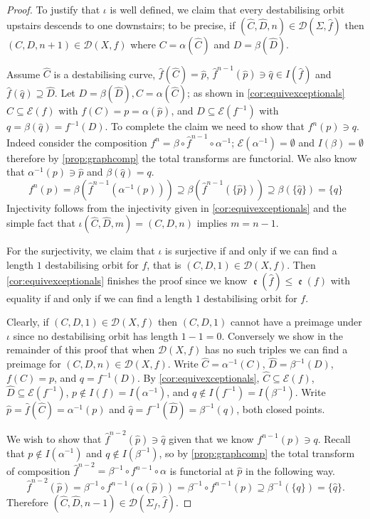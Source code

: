 \documentclass[11pt, final]{amsart}
\newcommand{\E}{\mathcal{E}}
\newcommand{\nin}{\notin}
\newcommand{\emp}{\emptyset}
\newcommand{\sgraph}{\Sigma}
\newcommand{\nice}{untangled}
\DeclareMathOperator{\comp}{\mathfrak e}
\begin{document}
\begin{proof}
To justify that $\iota$ is well defined, we claim that every destabilising orbit upstairs descends to one downstairs; to be precise, if $(\hat C, \hat D, n) \in \mathcal D(\sgraph, \hat f)$ then $(C, D, n+1) \in \mathcal D(X, f)$ where $C = \alpha(\hat C)$ and $D = \beta(\hat D)$.

Assume $\hat C$ is a destabilising curve, $\hat f(\hat C) = \hat p$, %
  $\hat f^{n-1}(\hat p) \ni \hat q \in I(\hat f)$ and $\hat f(\hat q) \supseteq \hat D$. Let $D = \beta(\hat D), C = \alpha(\hat C)$; as shown in \autoref{cor:equivexceptionals} $C \subseteq \E(f)$ with $f(C) = p = \alpha(\hat p)$, and $D \subseteq \E(f^{-1})$ with $q = \beta(\hat q) = f^{-1}(D)$. To complete the claim we need to show that $f^n(p) \ni q$.
 Indeed consider the composition $f^n = \beta \circ \hat f^{n-1} \circ \alpha^{-1}$; $\E(\alpha^{-1}) = \emp$ and $I(\beta) = \emp$ therefore by \autoref{prop:graphcomp} the total transforms are functorial. We also know that $\alpha^{-1}(p) \ni \hat p$ and $\beta(\hat q) = q$.
 \[f^n(p) = \beta ( \hat f^{n-1} ( \alpha^{-1}(p))) \supseteq \beta ( \hat f^{n-1} (\{\hat p\})) \supseteq \beta(\{\hat q\}) = \{q\}\]
 Injectivity follows from the injectivity given in \autoref{cor:equivexceptionals} and the simple fact that $\iota(\hat C, \hat D, m) = (C, D, n)$ implies $m=n - 1$.
 
For the surjectivity, we claim that $\iota$ is surjective if and only if we can find a length $1$ destabilising orbit for $f$, that is $(C, D, 1) \in \mathcal D(X, f)$. Then \autoref{cor:equivexceptionals} finishes the proof since we know $\comp(\hat f) \le \comp(f)$ with equality if and only if we can find a length $1$ destabilising orbit for $f$.

Clearly, if $(C, D, 1) \in \mathcal D(X, f)$ then $(C, D, 1)$ cannot have a preimage under $\iota$ since no destabilising orbit has length $1-1=0$. Conversely we show in the remainder of this proof that when $\mathcal D(X, f)$ has no such triples we can find a preimage for $(C, D, n) \in \mathcal D(X, f)$. Write $\hat C = \alpha^{-1}(C)$, $\hat D = \beta^{-1}(D)$, $f(C) = p$, and $q = f^{-1}(D)$. By \autoref{cor:equivexceptionals}, $\hat C \subseteq \E(f)$, $\hat D \subseteq \E(f^{-1})$, $p \nin I(f) = I(\alpha^{-1})$, and $q \nin I(f^{-1}) = I(\beta^{-1})$. Write $\hat p = \hat f(\hat C) = \alpha^{-1}(p)$ and $\hat q = f^{-1}(\hat D) = \beta^{-1}(q)$, both closed points.

We wish to show that $\hat f^{n-2}(\hat p) \ni \hat q$ given that we know $f^{n-1}(p) \ni q$. Recall that $p \nin I(\alpha^{-1})$ and $q \nin I(\beta^{-1})$, so by \autoref{prop:graphcomp} the total transform of composition $\hat f^{n-2} = \beta^{-1} \circ f^{n-1} \circ \alpha$ is functorial at $\hat p$ in the following way.
 \[\hat f^{n-2}(\hat p) = \beta^{-1} \circ f^{n-1} ( \alpha(\hat p)) = \beta^{-1} \circ f^{n-1} (p) \supseteq \beta^{-1}(\{q\}) = \{\hat q\}.\]
 Therefore $(\hat C, \hat D, n-1) \in \mathcal D(\sgraph_{\!f}, \hat f)$.
  \end{proof}
\end{document}
